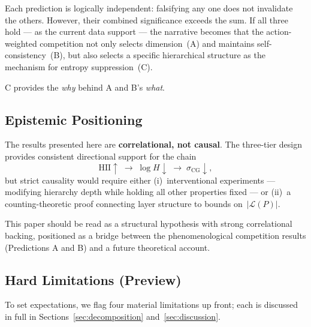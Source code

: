 \documentclass[entropy,article,submit,pdftex,moreauthors]{Definitions/mdpi}
\begin{document}
Each prediction is logically independent: falsifying any one does not invalidate the others. However, their combined significance exceeds the sum. If all three hold --- as the current data support --- the narrative becomes that the action-weighted competition not only selects dimension~(A) and maintains self-consistency~(B), but also selects a specific hierarchical structure as the mechanism for entropy suppression~(C).

C provides the \emph{why} behind A and B's \emph{what}.

\subsection{Epistemic Positioning}

The results presented here are \textbf{correlational, not causal}. The three-tier design provides consistent directional support for the chain
\begin{equation}
    \text{HII} \uparrow \;\to\; \log H \downarrow \;\to\; \sigma_\text{CG} \downarrow,
    \label{eq:chain}
\end{equation}
but strict causality would require either (i)~interventional experiments --- modifying hierarchy depth while holding all other properties fixed --- or (ii)~a counting-theoretic proof connecting layer structure to bounds on~$|\mathcal{L}(P)|$.

This paper should be read as a structural hypothesis with strong correlational backing, positioned as a bridge between the phenomenological competition results (Predictions A and B) and a future theoretical account.

\subsection{Hard Limitations (Preview)}

To set expectations, we flag four material limitations up front; each is discussed in full in Sections~\ref{sec:decomposition} and~\ref{sec:discussion}.
\end{document}
